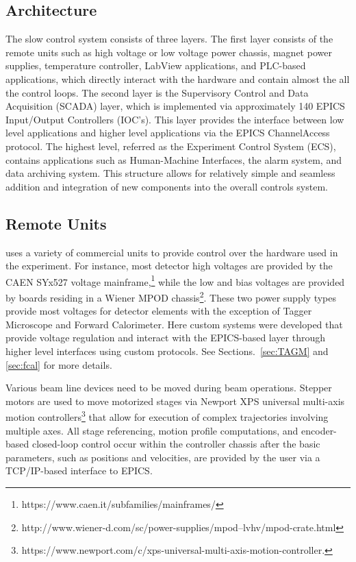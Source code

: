 \subsection{Architecture \label{sec:controlsarchitechture}}
The \gx{} slow control system consists of three layers. The first layer consists of the remote units such as high voltage or low voltage power chassis, magnet power supplies, temperature controller, LabView applications, and PLC-based applications, which directly interact with the hardware and contain almost the all the control loops. The second layer is the Supervisory Control and Data Acquisition (SCADA) layer, which is implemented via approximately 140 EPICS Input/Output Controllers (IOC's). This layer provides the interface between low level applications and higher level applications via the EPICS ChannelAccess protocol. The highest level, referred as the Experiment Control System (ECS), contains applications such as Human-Machine Interfaces, the alarm system, and data archiving system. This structure allows for relatively simple and seamless addition and integration of new components into the overall controls system.    

\subsection{Remote Units \label{sec:controlsinterface}}
\gx{} uses a variety of commercial units to provide control over the hardware used in the experiment. For instance, most detector high voltages are provided by the CAEN SYx527 voltage mainframe,\footnote{https://www.caen.it/subfamilies/mainframes/} while the low and bias voltages are provided by boards residing in a Wiener MPOD chassis\footnote{http://www.wiener-d.com/sc/power-supplies/mpod--lvhv/mpod-crate.html}. These two power supply types provide most voltages for detector elements with the exception of Tagger Microscope and Forward Calorimeter. Here custom systems were developed that provide voltage regulation and interact with the EPICS-based layer through higher level interfaces using custom protocols. See Sections.~\ref{sec:TAGM} and \ref{sec:fcal} for more details.  

Various beam line devices need to be moved during beam operations. Stepper motors are used to move motorized stages via Newport XPS universal multi-axis motion controllers\footnote{https://www.newport.com/c/xps-universal-multi-axis-motion-controller.} that allow for execution of complex trajectories involving multiple axes. All stage referencing, motion profile computations, and encoder-based closed-loop control occur within the controller chassis after the basic parameters, such as positions and velocities, are provided by the user via a TCP/IP-based interface to EPICS.   

